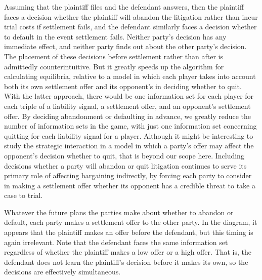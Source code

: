 \documentclass{article}
\begin{document}
Assuming that the plaintiff files and the defendant answers, then the plaintiff faces a decision whether the plaintiff will abandon the litigation rather than incur trial costs if settlement fails, and the defendant similarly faces a decision whether to default in the event settlement fails. Neither party's decision has any immediate effect, and neither party finds out about the other party's decision. The placement of these decisions before settlement rather than after is admittedly counterintuitive. But it greatly speeds up the algorithm for calculating equilibria, relative to a model in which each player takes into account both its own settlement offer and its opponent's in deciding whether to quit. With the latter approach, there would be one information set for each player for each triple of a liability signal, a settlement offer, and an opponent's settlement offer. By deciding abandonment or defaulting in advance, we greatly reduce the number of information sets in the game, with just one information set concerning quitting for each liability signal for a player. Although it might be interesting to study the strategic interaction in a model in which a party's offer may affect the opponent's decision whether to quit, that is beyond our scope here. Including decisions whether a party will abandon or quit litigation continues to serve its primary role of affecting bargaining indirectly, by forcing each party to consider in making a settlement offer whether its opponent has a credible threat to take a case to trial. 

Whatever the future plans the parties make about whether to abandon or default, each party makes a settlement offer to the other party. In the diagram, it appears that the plaintiff makes an offer before the defendant, but this timing is again irrelevant. Note that the defendant faces the same information set regardless of whether the plaintiff makes a low offer or a high offer. That is, the defendant does not learn the plaintiff's decision before it makes its own, so the decisions are effectively simultaneous. 
\end{document}
